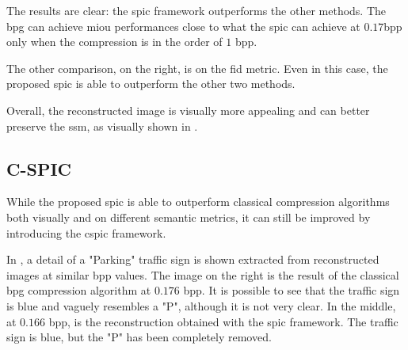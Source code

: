 The results are clear: the \gls{spic} framework outperforms the other methods. The \gls{bpg} can achieve \gls{miou} performances close to what the \gls{spic} can achieve at $0.17$\gls{bpp} only when the compression is in the order of $1$ \gls{bpp}.

The other comparison, on the right, is on the \gls{fid} metric. Even in this case, the proposed \gls{spic} is able to outperform the other two methods.

Overall, the reconstructed image is visually more appealing and can better preserve the \gls{ssm}, as visually shown in .

\subsection{C-SPIC}\label{sec: SPIC results c-spic}

While the proposed \gls{spic} is able to outperform classical compression algorithms both visually and on different semantic metrics, it can still be improved by introducing the \gls{cspic} framework.

In , a detail of a "Parking" traffic sign is shown extracted from reconstructed images at similar \gls{bpp} values. The image on the right is the result of the classical \gls{bpg} compression algorithm at $0.176$ \gls{bpp}. It is possible to see that the traffic sign is blue and vaguely resembles a "P", although it is not very clear. In the middle, at $0.166$ \gls{bpp}, is the reconstruction obtained with the \gls{spic} framework. The traffic sign is blue, but the "P" has been completely removed.

